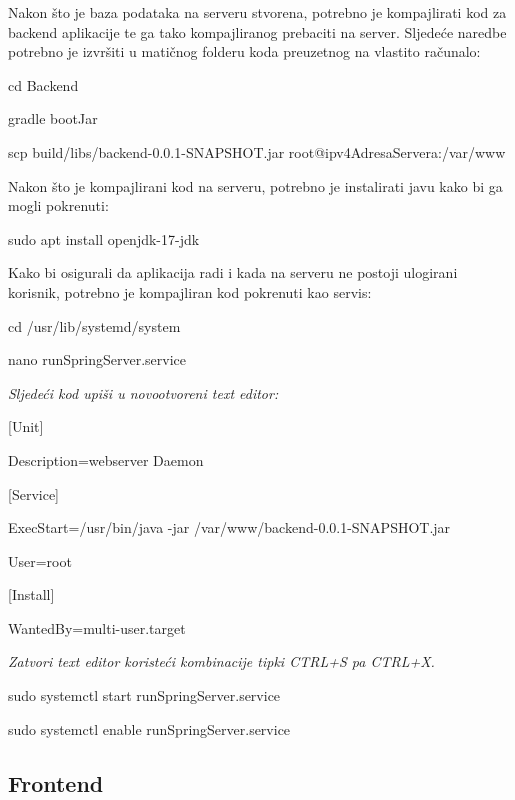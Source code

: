                 {Nakon što je baza podataka na serveru stvorena, potrebno je kompajlirati kod za backend aplikacije te ga tako kompajliranog prebaciti na server. Sljedeće naredbe potrebno je izvršiti u matičnog folderu koda preuzetnog na vlastito računalo:}

                \begin{packed_item}
        			\item {cd Backend}
        			\item {gradle bootJar}
        			\item {scp build/libs/backend-0.0.1-SNAPSHOT.jar root@ipv4AdresaServera:/var/www}
        		\end{packed_item}

                {Nakon što je kompajlirani kod na serveru, potrebno je instalirati javu kako bi ga mogli pokrenuti:}

                \begin{packed_item}
        			\item {sudo apt install openjdk-17-jdk}
        		\end{packed_item}

                {Kako bi osigurali da aplikacija radi i kada na serveru ne postoji ulogirani korisnik, potrebno je kompajliran kod pokrenuti kao servis:}

                \begin{packed_item}
        			\item {cd /usr/lib/systemd/system}
        			\item {nano runSpringServer.service}
        			\item \textit{Sljedeći kod upiši u novootvoreni text editor:}
        			\item {[Unit]}
                    \item {Description=webserver Daemon}
                    \item {[Service]}
                    \item {ExecStart=/usr/bin/java -jar /var/www/backend-0.0.1-SNAPSHOT.jar}
                    \item {User=root}
                    \item {[Install]}
                    \item {WantedBy=multi-user.target}
        			\item \textit{Zatvori text editor koristeći kombinacije tipki CTRL+S pa CTRL+X.}
        			\item {sudo systemctl start runSpringServer.service}
        			\item {sudo systemctl enable runSpringServer.service}
        		\end{packed_item}

            \subsection{Frontend}

                {}
			
			\eject 